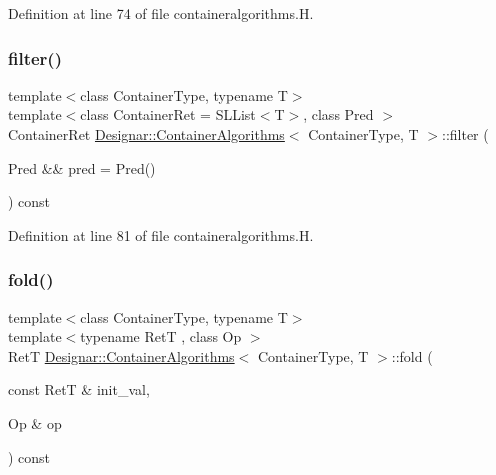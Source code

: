 Definition at line 74 of file containeralgorithms.\+H.

\mbox{\label{class_designar_1_1_container_algorithms_a9ee9df4da794711c3639a3c86d905443}} 
\subsubsection{\texorpdfstring{filter()}{filter()}\hspace{0.1cm}{\footnotesize\ttfamily [2/2]}}
{\footnotesize\ttfamily template$<$class Container\+Type, typename T$>$ \\
template$<$class Container\+Ret  = S\+L\+List$<$\+T$>$, class Pred $>$ \\
Container\+Ret \hyperlink{class_designar_1_1_container_algorithms}{Designar\+::\+Container\+Algorithms}$<$ Container\+Type, T $>$\+::filter (\begin{DoxyParamCaption}\item[{Pred \&\&}]{pred = {\ttfamily Pred()} }\end{DoxyParamCaption}) const\hspace{0.3cm}{\ttfamily [inline]}}



Definition at line 81 of file containeralgorithms.\+H.

\mbox{\label{class_designar_1_1_container_algorithms_a1b6d1cb2289bf894a2af994e9c6e1d03}} 
\subsubsection{\texorpdfstring{fold()}{fold()}\hspace{0.1cm}{\footnotesize\ttfamily [1/4]}}
{\footnotesize\ttfamily template$<$class Container\+Type, typename T$>$ \\
template$<$typename RetT , class Op $>$ \\
RetT \hyperlink{class_designar_1_1_container_algorithms}{Designar\+::\+Container\+Algorithms}$<$ Container\+Type, T $>$\+::fold (\begin{DoxyParamCaption}\item[{const RetT \&}]{init\+\_\+val,  }\item[{Op \&}]{op }\end{DoxyParamCaption}) const\hspace{0.3cm}{\ttfamily [inline]}}




